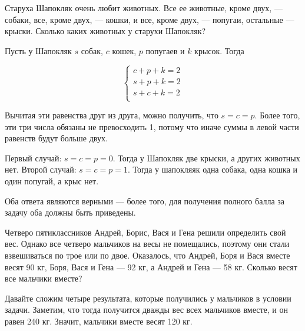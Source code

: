 \documentclass[11pt,a4paper,book]{ncc} \usepackage{modules/nonstahp_book}
\begin{document}



\begin{itemize}
\itA Старуха Шапокляк очень любит животных. Все ее животные, кроме двух, — собаки, все, кроме двух, — кошки, и все, кроме двух, — попугаи, остальные — крыски. Сколько каких животных у старухи Шапокляк?

\itr Пусть у Шапокляк $s$ собак, $c$ кошек, $p$ попугаев и $k$ крысок. Тогда

$$
\begin{cases}
c+p+k = 2 \\
s+p+k = 2 \\
s+c+k = 2 \\
\end{cases}
$$

Вычитая эти равенства друг из друга, можно получить, что $s=c=p$. Более того, эти три числа обязаны не превосходить 1, потому что иначе суммы в левой части равенств будут больше двух.

Первый случай: $s=c=p=0$. Тогда у Шапокляк две крыски, а других животных нет. Второй случай: $s=c=p=1$. Тогда у шапокляяк одна собака, одна кошка и один попугай, а крыс нет.

Оба ответа являются верными — более того, для получения полного балла за задачу оба должны быть приведены.

\itB Четверо пятиклассников Андрей, Борис, Вася и Гена решили определить свой вес. Однако  все четверо мальчиков на весы не помещались, поэтому они стали взвешиваться по трое или по двое. Оказалось, что Андрей, Боря и Вася вместе весят 90 кг, Боря, Вася и Гена — 92 кг, а Андрей и Гена — 58 кг. Сколько весят все мальчики вместе?

\itr Давайте сложим четыре результата, которые получились у мальчиков в условии задачи. Заметим, что тогда получится дважды вес всех мальчиков вместе, и он равен 240 кг. Значит, мальчики вместе весят 120 кг.

\end{itemize}
\end{document}

